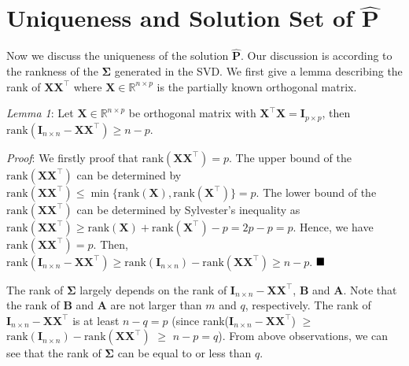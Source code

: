 \documentclass[titlepage,11pt,twoside]{article}
\begin{document}
\section{Uniqueness and Solution Set of $\mathbf{\hat{P}}$}

Now we discuss the uniqueness of the solution $\mathbf{\hat{P}}$. Our discussion is according to the rankness of the $\mathbf{\Sigma}$ generated in the SVD. We first give a lemma describing the rank of $\mathbf{X}\mathbf{X}^{\top}$ where $\mathbf{X}\in\mathbb{R}^{n\times p}$ is the partially known orthogonal matrix. 

\emph{Lemma 1}: Let $\mathbf{X}\in\mathbb{R}^{n\times p}$ be orthogonal matrix with $\mathbf{X}^{\top}\mathbf{X}=\mathbf{I}_{p\times p}$, then $\text{rank}(\mathbf{I}_{n\times n}-\mathbf{X}\mathbf{X}^{\top})\ge n-p$.

\emph{Proof}: We firstly proof that $\text{rank}(\mathbf{X}\mathbf{X}^{\top})=p$. The upper bound of the $\text{rank}(\mathbf{X}\mathbf{X}^{\top})$ can be determined by $\text{rank}(\mathbf{X}\mathbf{X}^{\top})\le\min\{\text{rank}(\mathbf{X}),\text{rank}(\mathbf{X}^{\top})\}=p$. The lower bound of the $\text{rank}(\mathbf{X}\mathbf{X}^{\top})$ can be determined by Sylvester's inequality as $\text{rank}(\mathbf{X}\mathbf{X}^{\top})\ge\text{rank}(\mathbf{X})+\text{rank}(\mathbf{X}^{\top})-p=2p-p=p$. Hence, we have $\text{rank}(\mathbf{X}\mathbf{X}^{\top})=p$. Then, $\text{rank}(\mathbf{I}_{n\times n}-\mathbf{X}\mathbf{X}^{\top})\ge\text{rank}(\mathbf{I}_{n\times n})-\text{rank}(\mathbf{X}\mathbf{X}^{\top})\ge n-p$. 
$\hfill\blacksquare$ 

The rank of $\mathbf{\Sigma}$ largely depends on the rank of $\mathbf{I}_{n\times n}-\mathbf{X}\mathbf{X}^{\top}$, $\mathbf{B}$ and $\mathbf{A}$. Note that the rank of $\mathbf{B}$ and $\mathbf{A}$ are not larger than $m$ and $q$, respectively. The rank of $\mathbf{I}_{n\times n}-\mathbf{X}\mathbf{X}^{\top}$ is at least $n-q=p$ (since rank($\mathbf{I}_{n\times n}-\mathbf{X}\mathbf{X}^{\top}$) $\ge$ $\text{rank}(\mathbf{I}_{n\times n}) - \text{rank}(\mathbf{X}\mathbf{X}^{\top})$ $\ge$ $n-p=q$). From above observations, we can see that the rank of $\mathbf{\Sigma}$ can be equal to or less than $q$. 
\end{document}
